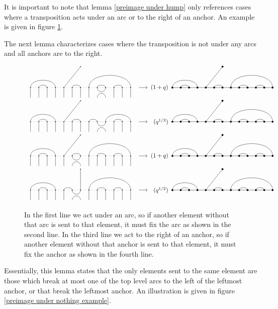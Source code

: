 \documentclass{amsart}
\begin{document}
 \vspace{5mm}
 It is important to note that lemma \ref{preimage under hump} only references cases where a transposition acts under an arc or to the right of an anchor. An example is given in figure \ref{preimage under hump example}. 
 
 The next lemma characterizes cases where the transposition is not under any arcs and all anchors are to the right.
 
 \begin{figure}[b]
 	\[
 	\begin{tabular}{l l l l}
 	\GeneralizedAction{13}{1/4,2/3,6/7,8/13,9/10,11/12}{1}{5/1}{5/4}{9}{1/4,2/3,6/7,8/13,9/10,11/12}{5/1}{(1+q)}\\
 	
 	\GeneralizedAction{13}{1/4,2/3,6/7,8/9,10/13,11/12}{1}{5/1}{5/4}{9}{1/4,2/3,6/7,8/13,9/10,11/12}{5/1}{(q^{1/2})}\\
 	
 	\GeneralizedAction{13}{1/4,2/3,6/7,8/13,9/10,11/12}{1}{5/1}{5/4}{6}{1/4,2/3,6/7,8/13,9/10,11/12}{5/1}{(1+q)}\\
 	
 	\GeneralizedAction{13}{1/4,2/3,5/6,8/13,9/10,11/12}{1}{7/1}{5/4}{6}{1/4,2/3,6/7,8/13,9/10,11/12}{5/1}{(q^{1/2})}\\
 	
 	\end{tabular}
 	\]
 	
 	\caption{In the first line we act under an arc, so if another element without that arc is sent to that element, it must fix the arc as shown in the second line. In the third line we act to the right of an anchor, so if another element without that anchor is sent to that element, it must fix the anchor as shown in the fourth line. 
 	}
 	\label{preimage under hump example}
 \end{figure}
 
 Essentially, this lemma states that the only elements sent to the same element are those which break at most one of the top level arcs to the left of the leftmost anchor, or that break the leftmost anchor. An illustration is given in figure \ref{preimage under nothing example}.
 
\end{document}
